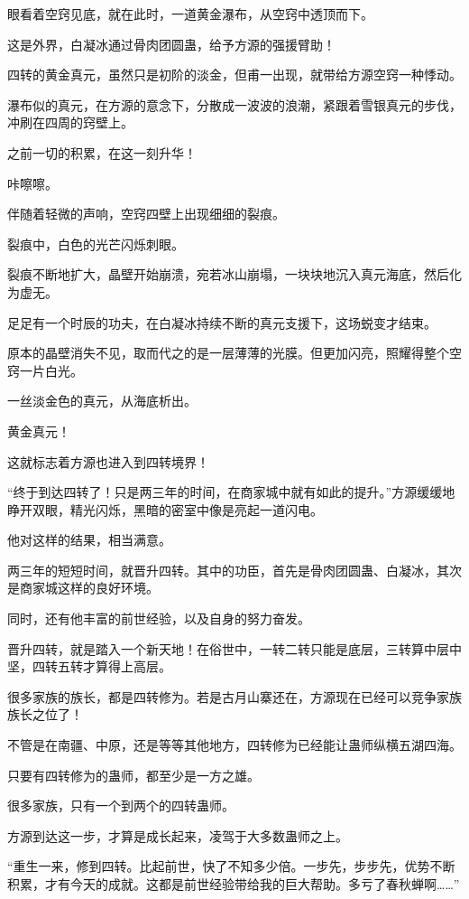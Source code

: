 \begin{this_body}
眼看着空窍见底，就在此时，一道黄金瀑布，从空窍中透顶而下。

这是外界，白凝冰通过骨肉团圆蛊，给予方源的强援臂助！

四转的黄金真元，虽然只是初阶的淡金，但甫一出现，就带给方源空窍一种悸动。

瀑布似的真元，在方源的意念下，分散成一波波的浪潮，紧跟着雪银真元的步伐，冲刷在四周的窍壁上。

之前一切的积累，在这一刻升华！

咔嚓嚓。

伴随着轻微的声响，空窍四壁上出现细细的裂痕。

裂痕中，白色的光芒闪烁刺眼。

裂痕不断地扩大，晶壁开始崩溃，宛若冰山崩塌，一块块地沉入真元海底，然后化为虚无。

足足有一个时辰的功夫，在白凝冰持续不断的真元支援下，这场蜕变才结束。

原本的晶壁消失不见，取而代之的是一层薄薄的光膜。但更加闪亮，照耀得整个空窍一片白光。

一丝淡金色的真元，从海底析出。

黄金真元！

这就标志着方源也进入到四转境界！

“终于到达四转了！只是两三年的时间，在商家城中就有如此的提升。”方源缓缓地睁开双眼，精光闪烁，黑暗的密室中像是亮起一道闪电。

他对这样的结果，相当满意。

两三年的短短时间，就晋升四转。其中的功臣，首先是骨肉团圆蛊、白凝冰，其次是商家城这样的良好环境。

同时，还有他丰富的前世经验，以及自身的努力奋发。

晋升四转，就是踏入一个新天地！在俗世中，一转二转只能是底层，三转算中层中坚，四转五转才算得上高层。

很多家族的族长，都是四转修为。若是古月山寨还在，方源现在已经可以竞争家族族长之位了！

不管是在南疆、中原，还是等等其他地方，四转修为已经能让蛊师纵横五湖四海。

只要有四转修为的蛊师，都至少是一方之雄。

很多家族，只有一个到两个的四转蛊师。

方源到达这一步，才算是成长起来，凌驾于大多数蛊师之上。

“重生一来，修到四转。比起前世，快了不知多少倍。一步先，步步先，优势不断积累，才有今天的成就。这都是前世经验带给我的巨大帮助。多亏了春秋蝉啊……”


\end{this_body}
